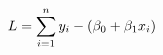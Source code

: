 \documentclass[preview]{standalone}
\begin{document}
\begin{align*}
\special{dvisvgm:raw <g id='unique000'>}L = \sum_{i=1}^n{y_i-(\beta_0+\beta_1 x_i)}\special{dvisvgm:raw </g>}
\end{align*}
\end{document}
